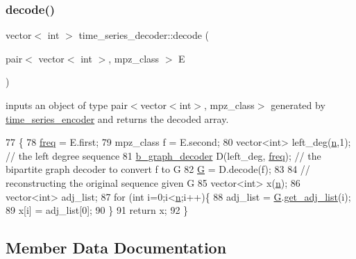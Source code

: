 \subsubsection{\texorpdfstring{decode()}{decode()}}
{\footnotesize\ttfamily vector$<$ int $>$ time\+\_\+series\+\_\+decoder\+::decode (\begin{DoxyParamCaption}\item[{pair$<$ vector$<$ int $>$, mpz\+\_\+class $>$}]{E }\end{DoxyParamCaption})}



inputs an object of type {\ttfamily pair$<$vector$<$int$>$, mpz\+\_\+class$>$} generated by {\ttfamily \hyperlink{classtime__series__encoder}{time\+\_\+series\+\_\+encoder}} and returns the decoded array. 


\begin{DoxyCode}
77 \{
78   \hyperlink{classtime__series__decoder_a25875d5879e79eeda27588b9cbcad591}{freq} = E.first;
79   mpz\_class f = E.second;
80   vector<int> left\_deg(\hyperlink{classtime__series__decoder_a05f75c42ac2acd63766714e6e09f1a65}{n},1); \textcolor{comment}{// the left degree sequence}
81   \hyperlink{classb__graph__decoder}{b\_graph\_decoder} D(left\_deg, \hyperlink{classtime__series__decoder_a25875d5879e79eeda27588b9cbcad591}{freq}); \textcolor{comment}{// the bipartite graph decoder to convert f to G}
82   \hyperlink{classtime__series__decoder_a66abe50babd1ebe2eb5a130d4b8091f1}{G} = D.decode(f);
83 
84   \textcolor{comment}{// reconstructing the original sequence given G}
85   vector<int> x(\hyperlink{classtime__series__decoder_a05f75c42ac2acd63766714e6e09f1a65}{n});
86   vector<int> adj\_list;
87   \textcolor{keywordflow}{for} (\textcolor{keywordtype}{int} i=0;i<\hyperlink{classtime__series__decoder_a05f75c42ac2acd63766714e6e09f1a65}{n};i++)\{
88     adj\_list = \hyperlink{classtime__series__decoder_a66abe50babd1ebe2eb5a130d4b8091f1}{G}.\hyperlink{classb__graph_aa81c7179b9c6cb4986c4b41e84a85799}{get\_adj\_list}(i);
89     x[i] = adj\_list[0];
90   \}
91   \textcolor{keywordflow}{return} x;
92 \}
\end{DoxyCode}


\subsection{Member Data Documentation}
\mbox{\label{classtime__series__decoder_a9e712b2d41cc124485c4d6f497504c29}} 
